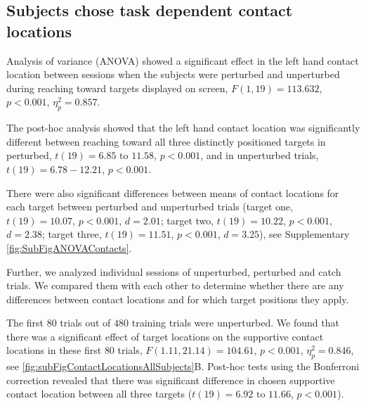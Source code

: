 
\subsection{Subjects chose task dependent contact locations} 

Analysis of 
variance (ANOVA) showed a significant effect in the left hand contact location between 
sessions when the subjects were perturbed and unperturbed during reaching toward 
targets displayed on screen, $F(1,19) = 113.632$, $p < 0.001$, $\eta_p^2 = 0.857$.

The post-hoc analysis showed that the left hand contact location was significantly 
different between reaching toward all three distinctly positioned targets in 
perturbed, $t(19) = 6.85 \text{ to } 11.58$, $p < 0.001$, and in unperturbed trials, $t(19) = 
6.78-12.21$, $p < 0.001$.

There were also significant differences between means of contact locations for 
each target between perturbed and unperturbed trials (target one, $t(19) = 10.07$, $p 
< 0.001$, $d = 2.01$; target two, $t(19) = 10.22$, $p < 0.001$, $d = 2.38$; target three, $t(19) = 
11.51$, $p < 0.001$, $d = 3.25$), see Supplementary \FigureAbbr 
\ref{fig:SubFigANOVAContacts}.






Further, we analyzed individual sessions of unperturbed, perturbed and catch 
trials. We compared them with each other to determine whether there are any 
differences between contact locations and for which target positions they apply.

The first $80$ trials out of $480$ training trials were unperturbed. We found that 
there was a significant effect of target locations on the supportive contact 
locations in these first $80$ trials, $F(1.11,21.14) = 104.61$, $p < 0.001$, $\eta_p^2 = 
0.846$, see \FigureAbbr \ref{fig:subFigContactLocationsAllSubjects}B. Post-hoc tests using the Bonferroni correction \cite{bland2000introduction} revealed 
that there was significant difference in chosen supportive contact location 
between all three targets ($t(19) = 6.92 \text{ to } 11.66$, $p < 0.001$).


